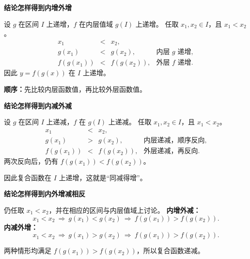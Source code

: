 \documentclass[UTF8,10pt,aspectratio=169]{ctexbeamer}
\newcommand{\PageHeading}[1]{\begin{center}{\Large\bfseries #1}\end{center}\vspace{0.2cm}}
\begin{document}
\begin{frame}[t,label=F06]
  \PageHeading{结论怎样得到\quad 内增外增}
  设 $g$ 在区间 $I$ 上递增，$f$ 在内层值域 $g(I)$ 上递增。
  任取 $x_1,x_2\in I$，且 $x_1<x_2$。
  \pause
  \[
  \begin{array}{rcll}
    x_1&<&x_2, &\\[2mm]
    g(x_1)&<&g(x_2),&\text{内层 }g\text{ 递增},\\[2mm]
    f(g(x_1))&<&f(g(x_2)),&\text{外层 }f\text{ 递增}.
  \end{array}
  \]
  因此 $y=f(g(x))$ 在 $I$ 上递增。
  \par\vspace{0.3cm}
  \textbf{顺序：}先比较内层函数值，再比较外层函数值。
\end{frame}

\begin{frame}[t,label=F07]
  \PageHeading{结论怎样得到\quad 内减外减}
  设 $g$ 在区间 $I$ 上递减，$f$ 在 $g(I)$ 上递减。
  任取 $x_1,x_2\in I$，且 $x_1<x_2$。
  \pause
  \[
  \begin{array}{rcll}
    x_1&<&x_2, &\\[2mm]
    g(x_1)&>&g(x_2),&\text{内层递减，顺序反向},\\[2mm]
    f(g(x_1))&<&f(g(x_2)),&\text{外层递减，再反向}.
  \end{array}
  \]
  两次反向后，仍有 $f(g(x_1))<f(g(x_2))$。
  \par\vspace{0.3cm}
  因此复合函数在 $I$ 上递增，这就是“同减得增”。
\end{frame}

\begin{frame}[t,label=F08]
  \PageHeading{结论怎样得到\quad 内外增减相反}
  仍任取 $x_1<x_2$，并在相应的区间与内层值域上讨论。
  \pause
  \textbf{内增外减：}
  \[
    x_1<x_2\ \Longrightarrow\ g(x_1)<g(x_2)
    \ \Longrightarrow\ f(g(x_1))>f(g(x_2)).
  \]
  \textbf{内减外增：}
  \[
    x_1<x_2\ \Longrightarrow\ g(x_1)>g(x_2)
    \ \Longrightarrow\ f(g(x_1))>f(g(x_2)).
  \]
  \par\vspace{0.3cm}
  两种情形均满足 $f(g(x_1))>f(g(x_2))$，所以复合函数递减。
\end{frame}
\end{document}
